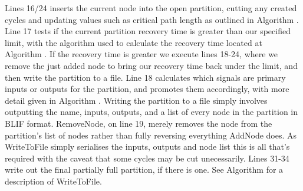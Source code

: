 \documentclass[12pt,final,oneside]{article} %
\begin{document}
Lines 16/24 inserts the current node into the open partition, cutting any created cycles and updating values such as critical path length as outlined in Algorithm \cite{addnode}.
Line 17 tests if the current partition recovery time is greater than our specified limit, with the algorithm used to calculate the recovery time located at Algorithm \cite{recoverytime}.
If the recovery time is greater we execute lines 18-24, where we remove the just added node to bring our recovery time back under the limit, and then write the partition to a file.
Line 18 calculates which signals are primary inputs or outputs for the partition, and promotes them accordingly, with more detail given in Algorithm \cite{makeiolist}.
Writing the partition to a file simply involves outputting the name, inputs, outputs, and a list of every node in the partition in \ac{BLIF} format.
RemoveNode, on line 19, merely removes the node from the partition's list of nodes rather than fully reversing everything AddNode does. As WriteToFile simply serialises the inputs, outputs and node list this is all that's required with the caveat that some cycles may be cut unecessarily.
Lines 31-34 write out the final partially full partition, if there is one. See Algorithm \cite{writetofile} for a description of WriteToFile.
\end{document}
